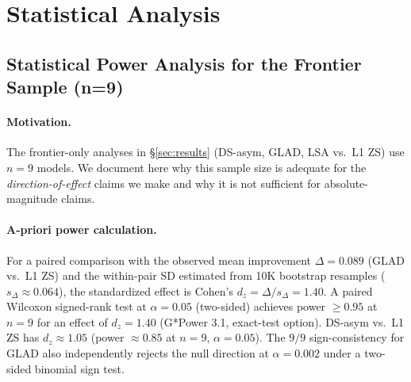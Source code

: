 \documentclass[11pt]{article}
\begin{document}
\section{Statistical Analysis}
\label{app:group_d}

\subsection{Statistical Power Analysis for the Frontier Sample (n=9)}
\label{app:power}

\paragraph{Motivation.} The frontier-only analyses in \S\ref{sec:results} (DS-asym, GLAD, LSA vs.\ L1 ZS) use $n=9$ models. We document here why this sample size is adequate for the \emph{direction-of-effect} claims we make and why it is not sufficient for absolute-magnitude claims.

\paragraph{A-priori power calculation.} For a paired comparison with the observed mean improvement $\Delta = 0.089$ (GLAD vs.\ L1 ZS) and the within-pair SD estimated from 10K bootstrap resamples ($s_\Delta \approx 0.064$), the standardized effect is Cohen's $d_z = \Delta / s_\Delta = 1.40$. A paired Wilcoxon signed-rank test at $\alpha=0.05$ (two-sided) achieves power $\geq 0.95$ at $n=9$ for an effect of $d_z = 1.40$ (G*Power 3.1, exact-test option). DS-asym vs.\ L1 ZS has $d_z \approx 1.05$ (power $\approx 0.85$ at $n=9$, $\alpha=0.05$). The $9/9$ sign-consistency for GLAD also independently rejects the null direction at $\alpha=0.002$ under a two-sided binomial sign test.
\end{document}
